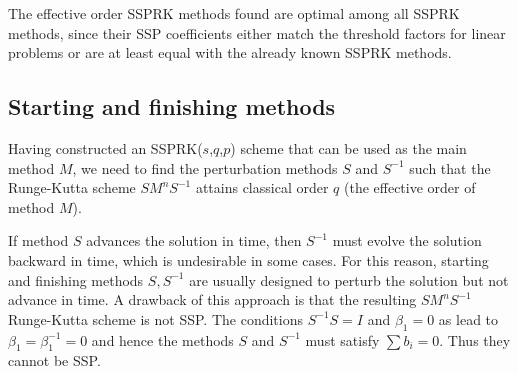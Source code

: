 
The effective order SSPRK methods found are optimal among all SSPRK methods, since their SSP coefficients either match the threshold factors for linear problems  or are at least equal with the already known SSPRK methods. 





\subsection{Starting and finishing methods}\label{subsection3.2}
Having constructed an SSPRK(\( s \),\( q \),\( p \)) scheme that can
be used as the main method \( M \), we need to find the perturbation
methods \( S \) and \( S^{-1} \) such that the Runge-Kutta scheme \(
SM^{n}S^{-1} \) attains classical order $q$ (the effective order of
method \( M \)).

If method $S$ advances the solution in time,
then $S^{-1}$ must evolve the solution backward in time, which is undesirable in
some cases.  For this reason,
starting and finishing methods $S,S^{-1}$ are usually designed to perturb
the solution but not advance in time.  
A drawback of this approach is that the resulting \(
SM^{n}S^{-1} \) Runge-Kutta scheme is not SSP. The conditions \( S^{-1}S = I \)
and \( \beta_{1} = 0 \) as lead to \( \beta_{1} = \beta^{-1}_{1} = 0 \) and
hence the methods \( S \) and \( S^{-1} \) must satisfy $\sum b_i = 0$.  Thus
they cannot be SSP.  


